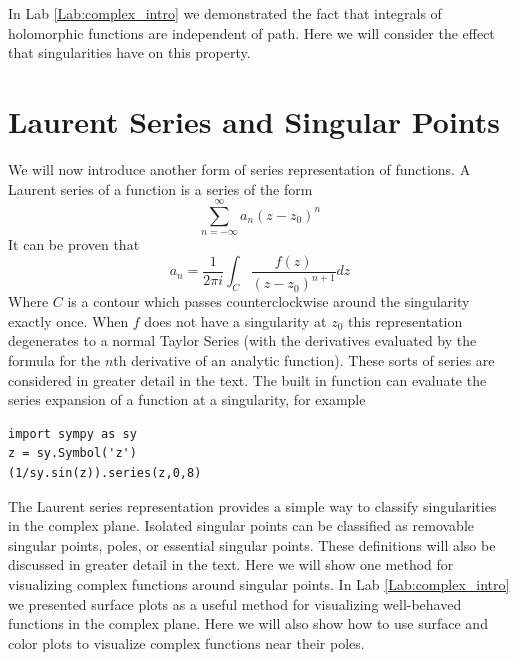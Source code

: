 

In Lab \ref{Lab:complex_intro} we demonstrated the fact that integrals of holomorphic functions are independent of path.
Here we will consider the effect that singularities have on this property.

\section*{Laurent Series and Singular Points}

We will now introduce another form of series representation of functions.
A Laurent series of a function is a series of the form
\[\sum_{n= -\infty}^{\infty} a_n (z-z_0)^n\]
It can be proven that
\[a_n = \frac{1}{2\pi i} \int_C \frac{f(z)}{(z-z_0)^{n+1}} dz\]
Where $C$ is a contour which passes counterclockwise around the singularity exactly once.
When $f$ does not have a singularity at $z_0$ this representation degenerates to a normal Taylor Series (with the derivatives evaluated by the formula for the $n$th derivative of an analytic function).
These sorts of series are considered in greater detail in the text.
The built in function  can evaluate the series expansion of a function at a singularity, for example
\begin{lstlisting}
import sympy as sy
z = sy.Symbol('z')
(1/sy.sin(z)).series(z,0,8)
\end{lstlisting}

The Laurent series representation provides a simple way to classify singularities in the complex plane.
Isolated singular points can be classified as removable singular points, poles, or essential singular points.
These definitions will also be discussed in greater detail in the text.
Here we will show one method for visualizing complex functions around singular points.
In Lab \ref{Lab:complex_intro} we presented surface plots as a useful method for visualizing well-behaved functions in the complex plane.
Here we will also show how to use surface and color plots to visualize complex functions near their poles.

